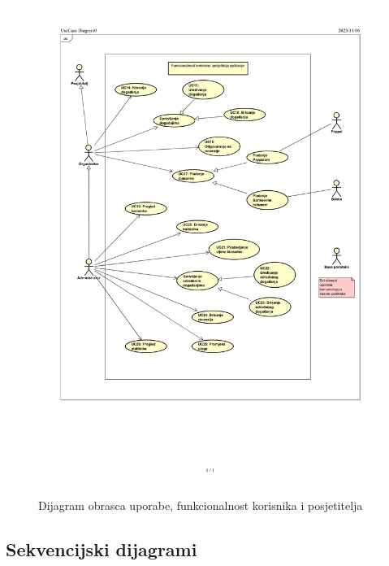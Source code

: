 					\begin{figure}[H]
						\includegraphics[scale=0.6]{slike/UC_dijagram2-1.PNG} %
						\centering
						\caption{Dijagram obrasca uporabe, funkcionalnost korisnika i posjetitelja}
						\label{fig:promjene}
					\end{figure}
				\eject		
				
			\subsection{Sekvencijski dijagrami}
				
				
				
